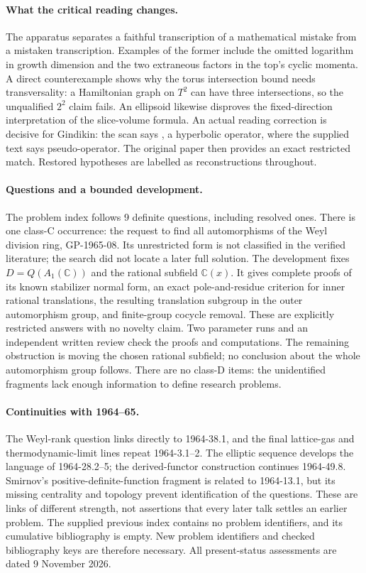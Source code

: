 \paragraph{What the critical reading changes.}
The apparatus separates a faithful transcription of a mathematical mistake
from a mistaken transcription. Examples of the former include the omitted
logarithm in growth dimension and the two extraneous factors in the top's
cyclic momenta. A direct counterexample shows why the torus intersection
bound needs transversality: a Hamiltonian graph on \(T^2\) can have three
intersections, so the unqualified \(2^2\) claim fails. An ellipsoid likewise
disproves the fixed-direction interpretation of the slice-volume formula.
An actual reading correction is decisive for Gindikin: the scan says
, a hyperbolic operator, where the supplied text says
pseudo-operator. The original paper then provides an exact restricted
match. Restored hypotheses are labelled as reconstructions throughout.

\paragraph{Questions and a bounded development.}
The problem index follows 9 definite questions, including resolved ones.
There is one class-C occurrence: the request to find all automorphisms of
the Weyl division ring, GP-1965-08. Its unrestricted form is not
classified in the verified literature; the search did not locate a later
full solution. The development fixes \(D=Q(A_1(\mathbb C))\) and the
rational subfield \(\mathbb C(x)\). It gives complete proofs of its known
stabilizer normal form, an exact pole-and-residue criterion for inner
rational translations, the resulting translation subgroup in the outer
automorphism group, and finite-group cocycle removal. These are explicitly
restricted answers with no novelty claim. Two parameter runs and an
independent written review check the proofs and computations. The remaining
obstruction is moving the chosen rational subfield; no conclusion about
the whole automorphism group follows. There are no class-D items: the
unidentified fragments lack enough information to define research problems.

\paragraph{Continuities with 1964--65.}
The Weyl-rank question links directly to 1964-38.1, and the final
lattice-gas and thermodynamic-limit lines repeat 1964-3.1--2. The elliptic
sequence develops the language of 1964-28.2--5; the derived-functor
construction continues 1964-49.8. Smirnov's positive-definite-function
fragment is related to 1964-13.1, but its missing centrality and topology
prevent identification of the questions. These are links of different
strength, not assertions that every later talk settles an earlier problem.
The supplied previous index contains no problem identifiers, and its
cumulative bibliography is empty. New problem identifiers and checked
bibliography keys are therefore necessary. All present-status assessments
are dated 9 November 2026.
